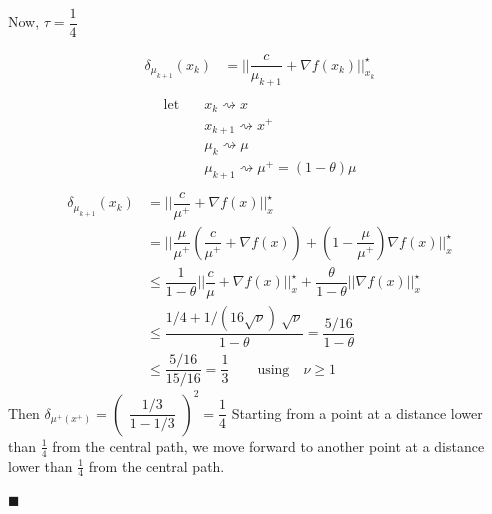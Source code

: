 \documentclass[10pt,a4paper]{article}
\begin{document}
Now, $\tau = \dfrac{1}{4}$

\begin{align*}\nonumber
\delta_{\mu_{k+1}}(x_k) &= || \dfrac{c}{\mu_{k+1}} + \nabla f(x_k) ||_{x_k}^{\star} \\ 
\end{align*}
\begin{align*}\nonumber
\text{let} &\quad x_k \rightsquigarrow x\\
&\quad x_{k+1} \rightsquigarrow x^+\\
&\quad \mu_k \rightsquigarrow \mu\\
&\quad \mu_{k+1} \rightsquigarrow \mu^+ = (1-\theta)\mu\\
\end{align*}
\begin{align*}\nonumber
\delta_{\mu_{k+1}}(x_k) &= || \dfrac{c}{\mu^+} + \nabla f(x) ||_x^{\star} \\
& \nonumber = || \dfrac{\mu}{\mu^{+}} (\dfrac{c}{\mu^+} + \nabla f(x)) + (1 - \dfrac{\mu}{\mu^+}) \nabla f(x) ||_x^{\star} \\
& \nonumber \leq \dfrac{1}{1 - \theta} || \dfrac{c}{\mu} + \nabla f(x) ||_x^{\star} + \dfrac{\theta}{1 - \theta} || \nabla f(x) ||_x^{\star} \\
& \nonumber \leq \dfrac{1/4 + 1/(16\sqrt{\nu})  ~ \sqrt{\nu}}{1 - \theta} = \dfrac{5/16}{1 - \theta} \\
& \nonumber \leq \dfrac{5/16}{15/16} = \dfrac{1}{3} \qquad \text{using} \quad \nu \geq 1
\end{align*}
Then $\delta_{\mu^+(x^+)} = \begin{pmatrix}
\dfrac{1/3}{1 - 1/3}
\end{pmatrix}^2 
= \dfrac{1}{4}$
Starting from a point at a distance lower than $\frac{1}{4}$ from the central path, we move forward to another point at a distance lower than   $\frac{1}{4}$ from the central path.

\begin{flushright}
$\blacksquare$
\end{flushright}
\end{document}
